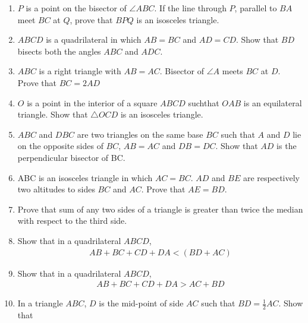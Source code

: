 \documentclass {article}
\begin{document}
\begin {enumerate}
[\textcolor{cyan}{Hint:} Recall how $\angle B = \angle C $ is proved when $AB = AC$].
\begin{center}
\texttt{[image: 7B]}
\end{center}
\item $P$ is a point on the bisector of $\angle ABC$. If the line through $P$, parallel to $BA$ meet $BC$ at $Q$, prove that $BPQ$ is an isosceles triangle.
\item $ABCD$ is a quadrilateral in which $AB = BC$ and $AD = CD$. Show that $BD$ bisects both the angles $ABC$ and $ADC$.
\item $ABC$ is a right triangle with $AB = AC$. Bisector of $\angle A$ meets $BC$ at $D$. Prove that $BC = 2 AD$
\item $O$ is a point in the interior of a square $ABCD$ suchthat $OAB$ is an equilateral triangle. Show that $\triangle  OCD$ is an isosceles triangle.
\item $ABC$ and $DBC$ are two triangles on the same base $BC$ such that $A$ and $D$ lie on the opposite sides of $BC$, $AB = AC$ and $DB = DC$. Show that $AD$ is the perpendicular bisector of BC.
\item ABC is an isosceles triangle in which $AC = BC$. $AD$ and $BE$ are respectively two altitudes to sides $BC$ and $AC$. Prove that $AE = BD$.
\item Prove that sum of any two sides of a triangle is greater than twice the median with respect to the third side.
\item Show that in a quadrilateral $ABCD$, 
\begin{align*}
     AB + BC + CD + DA  <  (BD + AC)
\end{align*}	

\item Show that in a quadrilateral $ABCD$,
\begin{align*}
	AB + BC + CD + DA  >   AC + BD
\end{align*}
\item In a triangle $ABC$, $D$ is the mid-point of side $AC$ such that $ BD = \frac{1}{2} AC $. Show that


\end{enumerate}
\end{document}
